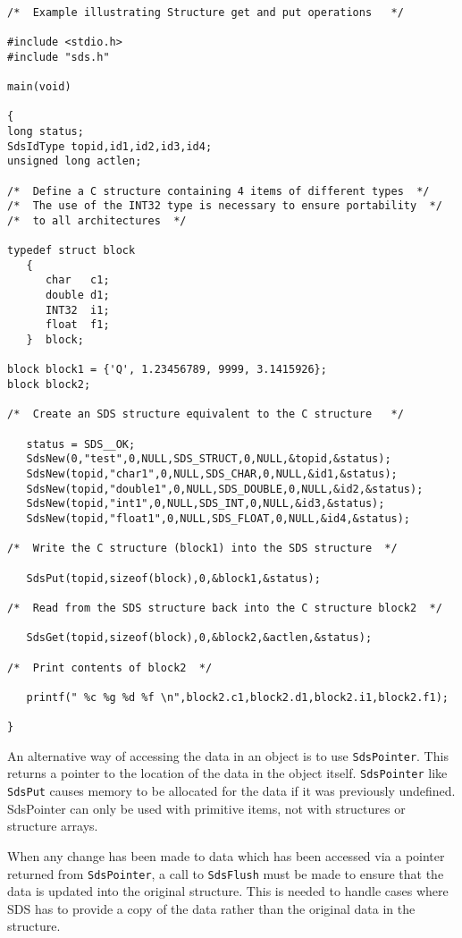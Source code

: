 \begin{verbatim}

/*  Example illustrating Structure get and put operations   */

#include <stdio.h>
#include "sds.h"

main(void)

{
long status;
SdsIdType topid,id1,id2,id3,id4;
unsigned long actlen;

/*  Define a C structure containing 4 items of different types  */
/*  The use of the INT32 type is necessary to ensure portability  */
/*  to all architectures  */

typedef struct block
   {
      char   c1;
      double d1;
      INT32  i1;
      float  f1; 
   }  block;

block block1 = {'Q', 1.23456789, 9999, 3.1415926};
block block2;

/*  Create an SDS structure equivalent to the C structure   */

   status = SDS__OK;
   SdsNew(0,"test",0,NULL,SDS_STRUCT,0,NULL,&topid,&status);
   SdsNew(topid,"char1",0,NULL,SDS_CHAR,0,NULL,&id1,&status);
   SdsNew(topid,"double1",0,NULL,SDS_DOUBLE,0,NULL,&id2,&status);
   SdsNew(topid,"int1",0,NULL,SDS_INT,0,NULL,&id3,&status);
   SdsNew(topid,"float1",0,NULL,SDS_FLOAT,0,NULL,&id4,&status);

/*  Write the C structure (block1) into the SDS structure  */

   SdsPut(topid,sizeof(block),0,&block1,&status);

/*  Read from the SDS structure back into the C structure block2  */

   SdsGet(topid,sizeof(block),0,&block2,&actlen,&status);
 
/*  Print contents of block2  */

   printf(" %c %g %d %f \n",block2.c1,block2.d1,block2.i1,block2.f1);

}
\end{verbatim}

An alternative way of accessing the data in an object is to use
\verb$SdsPointer$. This returns a pointer to the location of the data in the
object itself. \verb$SdsPointer$ like \verb$SdsPut$ causes memory to be
allocated for the data if it was previously undefined. SdsPointer can only be
used with primitive items, not with structures or structure arrays.

When any change has been made to data which has been accessed via a pointer 
returned from \verb$SdsPointer$, a call to \verb$SdsFlush$ must be made to
ensure that the data is updated into the original structure. This is needed to
handle cases where SDS has to provide a copy of the data rather than the
original data in the structure.

